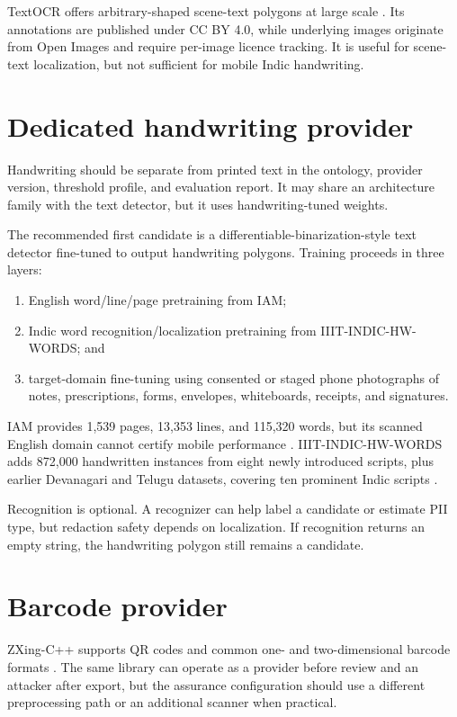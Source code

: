 TextOCR offers arbitrary-shaped scene-text polygons at large scale \citep{singh2021textocr}. Its annotations are published under CC BY 4.0, while underlying images originate from Open Images and require per-image licence tracking. It is useful for scene-text localization, but not sufficient for mobile Indic handwriting.

\section{Dedicated handwriting provider}

Handwriting should be separate from printed text in the ontology, provider version, threshold profile, and evaluation report. It may share an architecture family with the text detector, but it uses handwriting-tuned weights.

The recommended first candidate is a differentiable-binarization-style text detector fine-tuned to output handwriting polygons. Training proceeds in three layers:

\begin{enumerate}[leftmargin=7mm]
  \item English word/line/page pretraining from IAM;
  \item Indic word recognition/localization pretraining from IIIT-INDIC-HW-WORDS; and
  \item target-domain fine-tuning using consented or staged phone photographs of notes, prescriptions, forms, envelopes, whiteboards, receipts, and signatures.
\end{enumerate}

IAM provides 1,539 pages, 13,353 lines, and 115,320 words, but its scanned English domain cannot certify mobile performance \citep{dutta2018iam}. IIIT-INDIC-HW-WORDS adds 872,000 handwritten instances from eight newly introduced scripts, plus earlier Devanagari and Telugu datasets, covering ten prominent Indic scripts \citep{gongidi2021indic}.

Recognition is optional. A recognizer can help label a candidate or estimate PII type, but redaction safety depends on localization. If recognition returns an empty string, the handwriting polygon still remains a candidate.

\section{Barcode provider}

ZXing-C++ supports QR codes and common one- and two-dimensional barcode formats \citep{zxingcpp}. The same library can operate as a provider before review and an attacker after export, but the assurance configuration should use a different preprocessing path or an additional scanner when practical.

